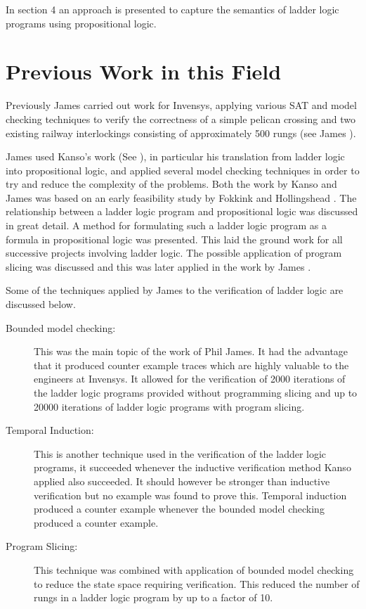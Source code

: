 \medskip

In section 4 an approach is presented to capture the semantics of ladder logic
programs using propositional logic.


\section{Previous Work in this Field}
Previously James carried out work for Invensys, applying various SAT and model
checking techniques to verify the correctness of a simple pelican crossing and
two existing railway interlockings consisting of approximately 500 rungs (see
James \cite{PJames}).

James used  Kanso's work (See \cite{KKanso}), in particular his 
translation from ladder logic into propositional logic,
and applied several model checking techniques in order to try and
reduce the complexity of the problems. Both the work by Kanso and James was based on an early feasibility study by
Fokkink and Hollingshead \cite{WF98}. The relationship between a ladder logic program and
propositional logic was discussed in great detail. A method for formulating
such a ladder logic program as a formula in propositional logic was
presented. This laid the ground work for all successive projects involving
ladder logic. The possible application of program slicing was discussed and
this was later applied in the work by James \cite{PJames}.

Some of the techniques applied by James to the verification of ladder logic
are discussed below.

\begin{description}


\item[Bounded model checking:] This was the  main topic of the work of Phil James. It had the advantage that it produced counter
  example traces which are highly valuable to the engineers at Invensys. It allowed for the
  verification of 2000 iterations of the ladder logic programs provided
  without programming slicing and up to 20000 iterations of ladder logic
  programs with program slicing.

\item[Temporal Induction:] This is another technique used in the verification
  of the ladder logic programs, it succeeded whenever the inductive verification method
  Kanso applied also succeeded. It should however be stronger than inductive
  verification but no example was found to prove this. Temporal induction produced a counter
  example whenever the bounded  model checking produced a counter example. 

\item[Program Slicing:] This technique was combined with application of
  bounded model checking to reduce the state space requiring
  verification. This reduced the number of rungs in a ladder logic program
  by up to a factor of 10.

\end{description}
